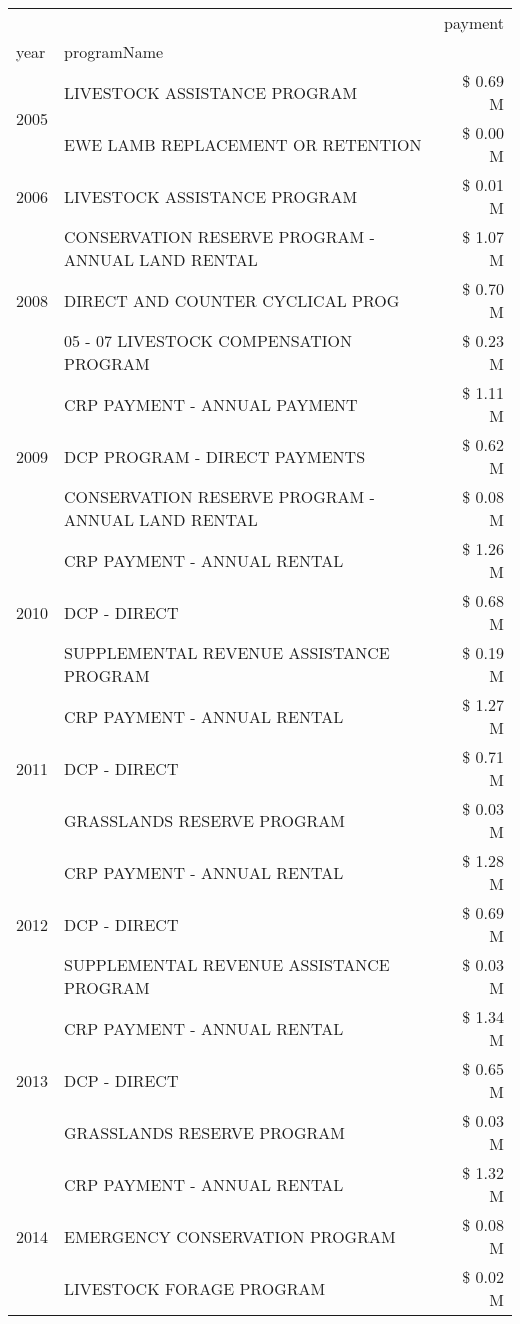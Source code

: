 \begin{tabular}{llr}
\toprule
 &  & payment \\
year & programName &  \\
\midrule
\multirow[t]{2}{*}{2005} & LIVESTOCK ASSISTANCE PROGRAM & \$ 0.69 M \\
 & EWE LAMB REPLACEMENT OR RETENTION & \$ 0.00 M \\
\cline{1-3}
2006 & LIVESTOCK ASSISTANCE PROGRAM & \$ 0.01 M \\
\cline{1-3}
\multirow[t]{3}{*}{2008} & CONSERVATION RESERVE PROGRAM - ANNUAL LAND RENTAL & \$ 1.07 M \\
 & DIRECT AND COUNTER CYCLICAL PROG & \$ 0.70 M \\
 & 05 - 07 LIVESTOCK COMPENSATION PROGRAM & \$ 0.23 M \\
\cline{1-3}
\multirow[t]{3}{*}{2009} & CRP PAYMENT - ANNUAL PAYMENT & \$ 1.11 M \\
 & DCP PROGRAM - DIRECT PAYMENTS & \$ 0.62 M \\
 & CONSERVATION RESERVE PROGRAM - ANNUAL LAND RENTAL & \$ 0.08 M \\
\cline{1-3}
\multirow[t]{3}{*}{2010} & CRP PAYMENT - ANNUAL RENTAL & \$ 1.26 M \\
 & DCP - DIRECT & \$ 0.68 M \\
 & SUPPLEMENTAL REVENUE ASSISTANCE PROGRAM & \$ 0.19 M \\
\cline{1-3}
\multirow[t]{3}{*}{2011} & CRP PAYMENT - ANNUAL RENTAL & \$ 1.27 M \\
 & DCP - DIRECT & \$ 0.71 M \\
 & GRASSLANDS RESERVE PROGRAM & \$ 0.03 M \\
\cline{1-3}
\multirow[t]{3}{*}{2012} & CRP PAYMENT - ANNUAL RENTAL & \$ 1.28 M \\
 & DCP - DIRECT & \$ 0.69 M \\
 & SUPPLEMENTAL REVENUE ASSISTANCE PROGRAM & \$ 0.03 M \\
\cline{1-3}
\multirow[t]{3}{*}{2013} & CRP PAYMENT - ANNUAL RENTAL & \$ 1.34 M \\
 & DCP - DIRECT & \$ 0.65 M \\
 & GRASSLANDS RESERVE PROGRAM & \$ 0.03 M \\
\cline{1-3}
\multirow[t]{3}{*}{2014} & CRP PAYMENT - ANNUAL RENTAL & \$ 1.32 M \\
 & EMERGENCY CONSERVATION PROGRAM & \$ 0.08 M \\
 & LIVESTOCK FORAGE PROGRAM & \$ 0.02 M \\
\cline{1-3}

\end{tabular}
